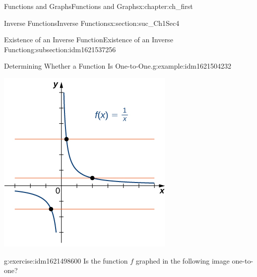 \documentclass[oneside,10pt,]{book}
\numberwithin{equation}{section}
\begin{document}
\begin{chapterptx}{Functions and Graphs}{}{Functions and Graphs}{}{}{x:chapter:ch_first}
\begin{sectionptx}{Inverse Functions}{}{Inverse Functions}{}{}{x:section:suc_Ch1Sec4}
\begin{subsectionptx}{Existence of an Inverse Function}{}{Existence of an Inverse Function}{}{}{g:subsection:idm1621537256}
\begin{example}{Determining Whether a Function Is One-to-One.}{g:example:idm1621504232}
\begin{enumerate}
\begin{image}{0.25}{0.5}{0.25}
\includegraphics[width=\linewidth]{external/CNX_Calc_Figure_01_04_006.jpg}
\end{image}%
%
\end{enumerate}
\end{example}
\begin{inlineexercise}{}{g:exercise:idm1621498600}%
Is the function \(f\) graphed in the following image one-to-one?%
\begin{image}{0.25}{0.5}{0.25}%

\end{image}
\end{inlineexercise}
\end{subsectionptx}
\end{sectionptx}
\end{chapterptx}
\end{document}
